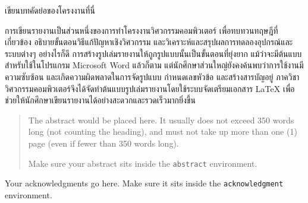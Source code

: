 \maketitle
\makesignature

\ifproject
    \begin{abstractTH}
        เขียนบทคัดย่อของโครงงานที่นี่

        การเขียนรายงานเป็นส่วนหนึ่งของการทำโครงงานวิศวกรรมคอมพิวเตอร์
        เพื่อทบทวนทฤษฎีที่เกี่ยวข้อง อธิบายขั้นตอนวิธีแก้ปัญหาเชิงวิศวกรรม และวิเคราะห์และสรุปผลการทดลองอุปกรณ์และระบบต่างๆ
        \enskip อย่างไรก็ดี การสร้างรูปเล่มรายงานให้ถูกรูปแบบนั้นเป็นขั้นตอนที่ยุ่งยาก
        แม้ว่าจะมีต้นแบบสำหรับใช้ในโปรแกรม Microsoft Word แล้วก็ตาม
        แต่นักศึกษาส่วนใหญ่ยังคงค้นพบว่าการใช้งานมีความซับซ้อน และเกิดความผิดพลาดในการจัดรูปแบบ กำหนดเลขหัวข้อ และสร้างสารบัญอยู่
        \enskip ภาควิชาวิศวกรรมคอมพิวเตอร์จึงได้จัดทำต้นแบบรูปเล่มรายงานโดยใช้ระบบจัดเตรียมเอกสาร
        \LaTeX{} เพื่อช่วยให้นักศึกษาเขียนรายงานได้อย่างสะดวกและรวดเร็วมากยิ่งขึ้น
    \end{abstractTH}

    \begin{abstract}
        The abstract would be placed here. It usually does not exceed 350 words
        long (not counting the heading), and must not take up more than one (1) page
        (even if fewer than 350 words long).

        Make sure your abstract sits inside the \texttt{abstract} environment.
    \end{abstract}

    \iffalse
        \begin{dedication}
            This document is dedicated to all Chiang Mai University students.

            Dedication page is optional.
        \end{dedication}
    \fi %

    \begin{acknowledgments}
        Your acknowledgments go here. Make sure it sits inside the
        \texttt{acknowledgment} environment.

    \end{acknowledgments}%
\fi %

\contentspage

\ifproject
    \figurelistpage

    \tablelistpage
\fi %



